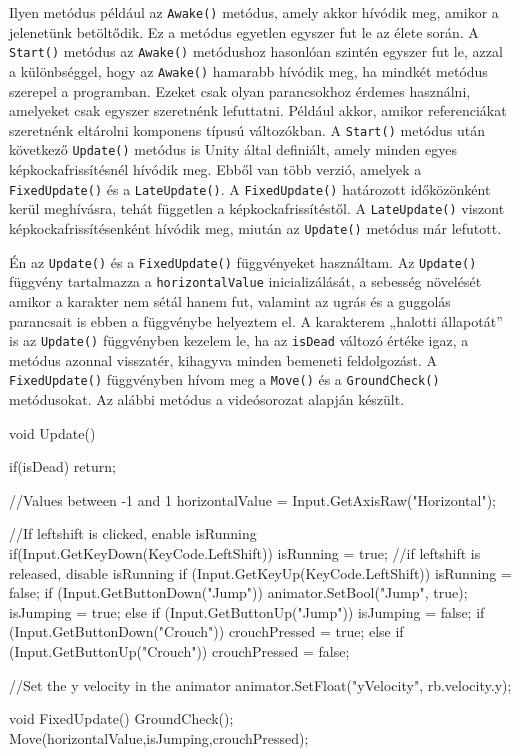 \newpage
Ilyen metódus például az \texttt{Awake()} metódus, amely akkor hívódik meg, amikor a jelenetünk betöltődik. Ez a metódus egyetlen egyszer fut le az élete során. A \texttt{Start()} metódus az \texttt{Awake()} metódushoz hasonlóan szintén egyszer fut le, azzal a különbséggel, hogy az \texttt{Awake()} hamarabb hívódik meg, ha mindkét metódus szerepel a programban. Ezeket csak olyan parancsokhoz érdemes használni, amelyeket csak egyszer szeretnénk lefuttatni. Például akkor, amikor referenciákat szeretnénk eltárolni komponens típusú változókban. A \texttt{Start()} metódus után következő \texttt{Update()} metódus is Unity által definiált, amely minden egyes képkockafrissítésnél hívódik meg. Ebből van több verzió, amelyek a \texttt{FixedUpdate()} és a \texttt{LateUpdate()}. A \texttt{FixedUpdate()} határozott időközönként kerül meghívásra, tehát független a képkockafrissítéstől. A \texttt{LateUpdate()} viszont képkockafrissítésenként hívódik meg, miután az \texttt{Update()} metódus már lefutott. 

Én az \texttt{Update()} és a \texttt{FixedUpdate()} függvényeket használtam. Az \texttt{Update()} függvény tartalmazza a \texttt{horizontalValue} inicializálását, a sebesség növelését amikor a karakter nem sétál hanem fut, valamint az ugrás és a guggolás parancsait is ebben a függvénybe helyeztem el. A karakterem „halotti állapotát” is az \texttt{Update()} függvényben kezelem le, ha az \texttt{isDead} változó értéke igaz, a metódus azonnal visszatér, kihagyva minden bemeneti feldolgozást. A \texttt{FixedUpdate()} függvényben hívom meg a \texttt{Move()} és a \texttt{GroundCheck()} metódusokat. Az alábbi metódus a \cite{youtubeplaylist} videósorozat alapján készült.

\begin{java}
 void Update()
 {
     if(isDead) return;

     //Values between -1 and 1 
     horizontalValue = Input.GetAxisRaw("Horizontal");

     //If leftshift is clicked, enable isRunning
     if(Input.GetKeyDown(KeyCode.LeftShift))
     {
         isRunning = true;
     }
     //if leftshift is released, disable isRunning
     if (Input.GetKeyUp(KeyCode.LeftShift))
     {
         isRunning = false;
     }
     if (Input.GetButtonDown("Jump"))
     {
         animator.SetBool("Jump", true);
         isJumping = true;
     }
     else if (Input.GetButtonUp("Jump"))
     {
         isJumping = false;
     }
     if (Input.GetButtonDown("Crouch"))
     {
         crouchPressed = true;
     }
     else if (Input.GetButtonUp("Crouch"))
     {
         crouchPressed = false;
     }

     //Set the y velocity in the animator
     animator.SetFloat("yVelocity", rb.velocity.y);

 }

 void FixedUpdate()
 {
     GroundCheck();
     Move(horizontalValue,isJumping,crouchPressed);
 }
\end{java}

